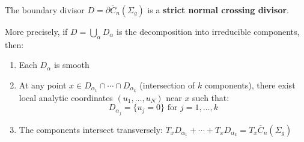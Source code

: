 \begin{theorem}\label{thm:normal-crossings}
The boundary divisor $D = \partial\overline{C}_n(\Sigma_g)$ is a \textbf{strict normal crossing divisor}. 

More precisely, if $D = \bigcup_{\alpha} D_\alpha$ is the decomposition into irreducible components, then:
\begin{enumerate}
\item Each $D_\alpha$ is smooth
\item At any point $x \in D_{\alpha_1} \cap \cdots \cap D_{\alpha_k}$ (intersection of $k$ components), there exist local analytic coordinates $(u_1, \ldots, u_N)$ near $x$ such that:
$$D_{\alpha_j} = \{u_j = 0\} \text{ for } j = 1,\ldots,k$$
\item The components intersect transversely: $T_x D_{\alpha_1} + \cdots + T_x D_{\alpha_k} = T_x \overline{C}_n(\Sigma_g)$
\end{enumerate}
\end{theorem}

